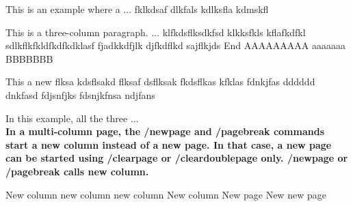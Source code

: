 \documentclass[twocolumn]{article}
\begin{document}
	This is an example where a ... fklkdsaf dlkfals kdlksfla kdmskfl
	\begin{multicols}{3}
		\raggedright
		This is a three-column paragraph. ... klfkdsflksdkfsd klkksfkls kflafkdfkl sdlkflkfkldfkdfkdklasf fjadkkdfjlk djfkdflkd sajflkjds End AAAAAAAAA aaaaaaa BBBBBBB \columnbreak
		
		 \large This a new flksa kdsflsakd flksaf dsflksak fkdsflkas kfklas fdnkjfas dddddd dnkfasd fdjsnfjks fdsnjkfnsa ndjfans
	\end{multicols}
	In this example, all the three ...\\
	\Large\bfseries
	In a multi-column page, the /newpage and /pagebreak commands start a new column instead of a new page. In that case, a new page can be started using /clearpage or /cleardoublepage only.
	\newpage
	/newpage or /pagebreak calls new column.
	\pagebreak 
	\normalfont

	New column
	\newpage
	new column
	\pagebreak
	new column
	\newpage
	New column
	\clearpage
	New page
	\cleardoublepage
	New new page
 
\end{document}
